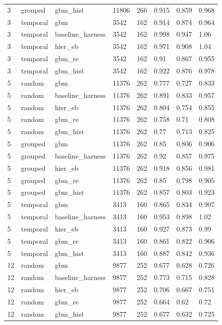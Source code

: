\begin{tabular}{llllllll}
3 & grouped & gbm\_hist & 11806 & 266 & 0.915 & 0.859 & 0.968 \\
3 & temporal & gbm & 3542 & 162 & 0.914 & 0.874 & 0.964 \\
3 & temporal & baseline\_harness & 3542 & 162 & 0.998 & 0.947 & 1.06 \\
3 & temporal & hier\_eb & 3542 & 162 & 0.971 & 0.908 & 1.04 \\
3 & temporal & gbm\_re & 3542 & 162 & 0.91 & 0.867 & 0.955 \\
3 & temporal & gbm\_hist & 3542 & 162 & 0.922 & 0.876 & 0.978 \\
5 & random & gbm & 11376 & 262 & 0.777 & 0.727 & 0.833 \\
5 & random & baseline\_harness & 11376 & 262 & 0.891 & 0.833 & 0.957 \\
5 & random & hier\_eb & 11376 & 262 & 0.804 & 0.754 & 0.855 \\
5 & random & gbm\_re & 11376 & 262 & 0.758 & 0.71 & 0.808 \\
5 & random & gbm\_hist & 11376 & 262 & 0.77 & 0.713 & 0.825 \\
5 & grouped & gbm & 11376 & 262 & 0.85 & 0.806 & 0.906 \\
5 & grouped & baseline\_harness & 11376 & 262 & 0.92 & 0.857 & 0.975 \\
5 & grouped & hier\_eb & 11376 & 262 & 0.918 & 0.856 & 0.981 \\
5 & grouped & gbm\_re & 11376 & 262 & 0.85 & 0.798 & 0.905 \\
5 & grouped & gbm\_hist & 11376 & 262 & 0.857 & 0.803 & 0.923 \\
5 & temporal & gbm & 3413 & 160 & 0.865 & 0.834 & 0.907 \\
5 & temporal & baseline\_harness & 3413 & 160 & 0.953 & 0.898 & 1.02 \\
5 & temporal & hier\_eb & 3413 & 160 & 0.927 & 0.873 & 0.99 \\
5 & temporal & gbm\_re & 3413 & 160 & 0.861 & 0.822 & 0.906 \\
5 & temporal & gbm\_hist & 3413 & 160 & 0.887 & 0.842 & 0.936 \\
12 & random & gbm & 9877 & 252 & 0.677 & 0.628 & 0.726 \\
12 & random & baseline\_harness & 9877 & 252 & 0.773 & 0.715 & 0.828 \\
12 & random & hier\_eb & 9877 & 252 & 0.706 & 0.667 & 0.751 \\
12 & random & gbm\_re & 9877 & 252 & 0.664 & 0.62 & 0.72 \\
12 & random & gbm\_hist & 9877 & 252 & 0.677 & 0.632 & 0.725 \\

\end{tabular}

